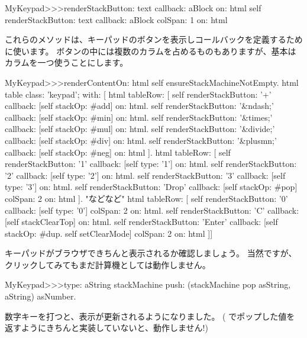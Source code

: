 \documentclass[a4paper,10pt,twoside]{book}
\begin{document}
\begin{code}{}
MyKeypad>>>renderStackButton: text callback: aBlock on: html 
	self 
		renderStackButton: text
		callback: aBlock
		colSpan: 1
		on: html
\end{code}

これらのメソッドは、キーパッドのボタンを表示しコールバックを定義するために使います。
ボタンの中には複数のカラムを占めるものもありますが、基本はカラムを一つ使うことにします。


\begin{code}{}
MyKeypad>>>renderContentOn: html 
  self ensureStackMachineNotEmpty.
  html table
    class: 'keypad';
    with: [
      html tableRow: [
          self renderStackButton: '+' callback: [self stackOp: #add] on: html.
          self renderStackButton: '&ndash;' callback: [self stackOp: #min] on: html.
          self renderStackButton: '&times;' callback: [self stackOp: #mul] on: html.
          self renderStackButton: '&divide;' callback: [self stackOp: #div] on: html.
          self renderStackButton: '&plusmn;' callback: [self stackOp: #neg] on: html ].
        html tableRow: [
          self renderStackButton: '1' callback: [self type: '1'] on: html.
          self renderStackButton: '2' callback: [self type: '2'] on: html.
          self renderStackButton: '3' callback: [self type: '3'] on: html.
          self renderStackButton: 'Drop' callback: [self stackOp: #pop]
          	colSpan: 2 on: html ].
"などなど"
        html tableRow: [
          self renderStackButton: '0' callback: [self type: '0'] colSpan: 2 on: html.
          self renderStackButton: 'C' callback: [self stackClearTop] on: html.
          self renderStackButton: 'Enter'
          	callback: [self stackOp: #dup. self setClearMode]
			colSpan: 2 on: html ]]
\end{code}

キーパッドがブラウザできちんと表示されるか確認しましょう。
当然ですが、クリックしてみてもまだ計算機としては動作しません。

\begin{code}{}
MyKeypad>>>type: aString
	stackMachine push: (stackMachine pop asString, aString) asNumber.
\end{code}
数字キーを打つと、表示が更新されるようになりました。
( でポップした値を返すようにきちんと実装していないと、動作しません!)
\end{document}
